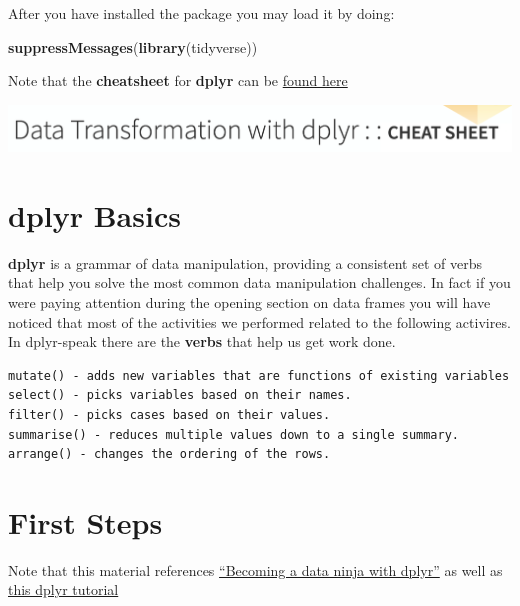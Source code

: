 \documentclass[]{book}
\newenvironment{Shaded}{\begin{snugshade}}{\end{snugshade}}
\newcommand{\KeywordTok}[1]{\textcolor[rgb]{0.13,0.29,0.53}{\textbf{#1}}}
\newcommand{\NormalTok}[1]{#1}
\begin{document}
After you have installed the package you may load it by doing:

\begin{Shaded}
\begin{Highlighting}[]
\KeywordTok{suppressMessages}\NormalTok{(}\KeywordTok{library}\NormalTok{(tidyverse))}
\end{Highlighting}
\end{Shaded}

Note that the \textbf{cheatsheet} for \textbf{dplyr} can be \href{https://github.com/rstudio/cheatsheets/blob/master/data-transformation.pdf}{found here}

\includegraphics{./figures/cheat.png}

\hypertarget{dplyr-basics}{%
\section{dplyr Basics}\label{dplyr-basics}}

\textbf{dplyr} is a grammar of data manipulation, providing a consistent set of verbs that help you solve the most common data manipulation challenges. In fact if you were paying attention during the opening section on data frames you will have noticed that most of the activities we performed related to the following activires. In dplyr-speak there are the \textbf{verbs} that help us get work done.

\begin{verbatim}
mutate() - adds new variables that are functions of existing variables
select() - picks variables based on their names.
filter() - picks cases based on their values.
summarise() - reduces multiple values down to a single summary.
arrange() - changes the ordering of the rows.
\end{verbatim}

\hypertarget{first-steps}{%
\section{First Steps}\label{first-steps}}

Note that this material references \href{https:\%20//speakerdeck.com/dpastoor/becoming-a-data-ninja-with-dplyr}{``Becoming a data ninja with dplyr''} as well as \href{http://genomicsclass.github.io/book/pages/dplyr_tutorial.html}{this dplyr tutorial}
\end{document}
